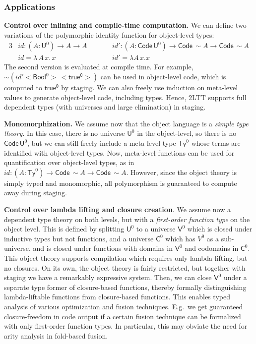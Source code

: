 \documentclass{easychair}
\newcommand{\U}{\mathsf{U}}
\newcommand{\Code}{\mathsf{Code}}
\newcommand{\Ty}{\mathsf{Ty}}
\newcommand{\V}{\mathsf{V}}
\newcommand{\C}{\mathsf{C}}
\begin{document}
\subsubsection*{Applications}

\textbf{Control over inlining and compile-time computation.} We can define two
variations of the polymorphic identity function for object-level types:
\begin{alignat*}{3}
  & \mathit{id} : (A : \U^0) \to A \to A \hspace{2em}&& \mathit{id'} : (A : \Code\,\U^0) \to \Code\,\sim\!A \to \Code\,\sim\!A\\
  & \mathit{id} = \lambda\,A\,x.\,x      && \mathit{id'} = \lambda A\,x.x
\end{alignat*}
The second version is evaluated at compile time. For example,
$\sim\!(\mathit{id'}<\!\mathsf{Bool^0}\!>\,<\!\mathsf{true^0}\!>)$ can be used
in object-level code, which is computed to $\mathsf{true^0}$ by staging. We can
also freely use induction on meta-level values to generate object-level code,
including types. Hence, 2LTT supports full dependent types (with universes and
large elimination) in staging.

\textbf{Monomorphization.} We assume now that the object language is a
\emph{simple type theory}. In this case, there is no universe $\U^0$ in the
object-level, so there is no $\Code\,\U^0$, but we can still freely include a
meta-level type $\Ty^0$ whose terms are identified with object-level types. Now,
meta-level functions can be used for quantification over object-level types, as in
$\mathit{id} : (A : \Ty^0) \to \Code\,\sim\!A \to \Code\,\sim\!A$. However,
since the object theory is simply typed and monomorphic, all polymorphism is
guaranteed to compute away during staging.

\textbf{Control over lambda lifting and closure creation}. We assume now a
dependent type theory on both levels, but with a \emph{first-order function
type} on the object level. This is defined by splitting $\U^0$ to a universe
$\V^0$ which is closed under inductive types but not functions, and a universe
$\C^0$ which has $V^0$ as a sub-universe, and is closed under functions with
domains in $\V^0$ and codomains in $\C^0$. This object theory supports
compilation which requires only lambda lifting, but no closures. On its own, the
object theory is fairly restricted, but together with staging we have a
remarkably expressive system. Then, we can close $\V^0$ under a separate type
former of closure-based functions, thereby formally distinguishing
lambda-liftable functions from closure-based functions. This enables typed
analysis of various optimization and fusion techniques. E.g.\ we get guaranteed
closure-freedom in code output if a certain fusion technique can be formalized
with only first-order function types. In particular, this may obviate the need
for arity analysis \cite{DBLP:journals/cl/Breitner18} in fold-based fusion.
\end{document}
